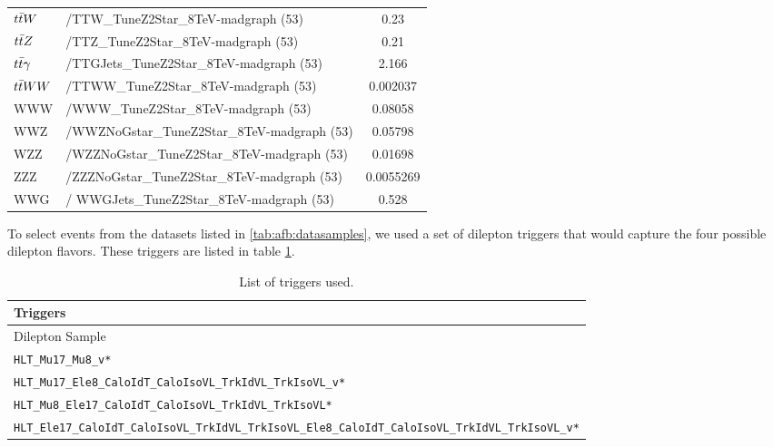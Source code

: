 \begin{table}[pht]
\begin{center}
{\begin{tabular}{l|l|c}
$t\bar{t} W$                                       &   /TTW\_TuneZ2Star\_8TeV-madgraph (53)                   &  0.23 \\
$t\bar{t} Z$                                       &   /TTZ\_TuneZ2Star\_8TeV-madgraph (53)                   &  0.21 \\
$t\bar{t} \gamma$                      &   /TTGJets\_TuneZ2Star\_8TeV-madgraph (53)            &  2.166 \\
$t\bar{t} W W$                                     &   /TTWW\_TuneZ2Star\_8TeV-madgraph (53)        &  0.002037  \\
WWW     & /WWW\_TuneZ2Star\_8TeV-madgraph (53)                  & 0.08058 \\
WWZ     & /WWZNoGstar\_TuneZ2Star\_8TeV-madgraph (53)           & 0.05798 \\
WZZ     & /WZZNoGstar\_TuneZ2Star\_8TeV-madgraph (53)           & 0.01698 \\
ZZZ     & /ZZZNoGstar\_TuneZ2Star\_8TeV-madgraph (53)           & 0.0055269 \\
WWG     & / WWGJets\_TuneZ2Star\_8TeV-madgraph (53)             & 0.528 \\
\hline\hline
\end{tabular}
}
\end{center}
\end{table}

To select events from the datasets listed in
\ref{tab:afb:datasamples}, we used a set of dilepton triggers that
would capture the four possible dilepton flavors. These triggers are
listed in table \ref{tab:afb:triggers}.

\begin{table}[!ht]
\begin{center}
\caption{List of triggers used.}
\label{tab:afb:triggers}
\begin{tabular}{l}
\hline\hline
Triggers   \\
\hline\hline
Dilepton Sample \\
\hline
\footnotesize{\verb=HLT_Mu17_Mu8_v*=}\\
\footnotesize{\verb=HLT_Mu17_Ele8_CaloIdT_CaloIsoVL_TrkIdVL_TrkIsoVL_v*=}\\
\footnotesize{\verb=HLT_Mu8_Ele17_CaloIdT_CaloIsoVL_TrkIdVL_TrkIsoVL*=}\\
\footnotesize{\verb=HLT_Ele17_CaloIdT_CaloIsoVL_TrkIdVL_TrkIsoVL_Ele8_CaloIdT_CaloIsoVL_TrkIdVL_TrkIsoVL_v*=}\\
\hline
\end{tabular}
\end{center}
\end{table}

